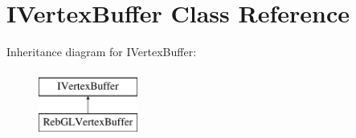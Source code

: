 \hypertarget{class_i_vertex_buffer}{}\section{I\+Vertex\+Buffer Class Reference}
\label{class_i_vertex_buffer}
Inheritance diagram for I\+Vertex\+Buffer\+:\begin{figure}[H]
\begin{center}
\leavevmode
\includegraphics[height=2.000000cm]{class_i_vertex_buffer}
\end{center}
\end{figure}
